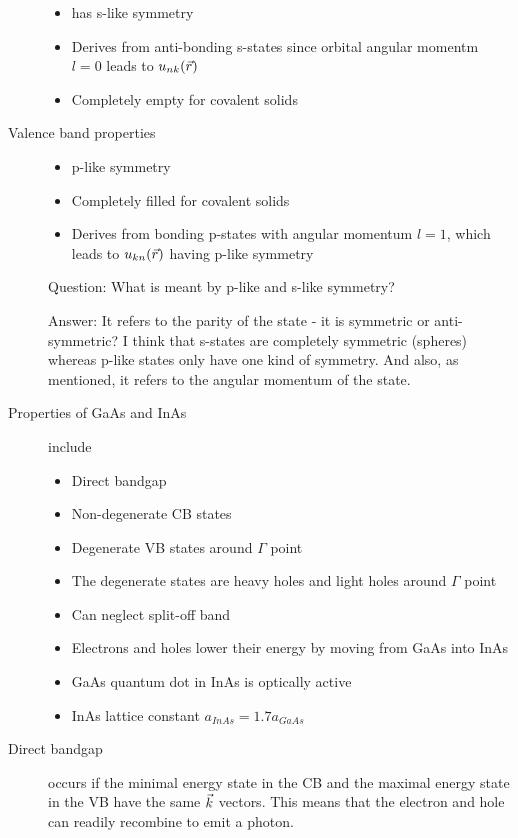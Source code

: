 \begin{description}
\begin{itemize}
\item has s-like symmetry
\item Derives from anti-bonding s-states since orbital angular momentm $l = 0$ leads to $u_{nk}(\vec{r})$ 
\item Completely empty for covalent solids
\end{itemize}

\item[Valence band properties]
\begin{itemize}
\item p-like symmetry
\item Completely filled for covalent solids
\item Derives from bonding p-states with angular momentum $l = 1$, which leads to $u_{kn}(\vec{r})$ having p-like symmetry
\end{itemize}

Question: What is meant by p-like and s-like symmetry?

Answer: It refers to the parity of the state - it is symmetric or anti-symmetric? I think that s-states are completely symmetric (spheres) whereas p-like states only have one kind of symmetry. And also, as mentioned, it refers to the angular momentum of the state. 

\item[Properties of GaAs and InAs] include
\begin{itemize}
\item Direct bandgap
\item Non-degenerate CB states
\item Degenerate VB states around $\Gamma$ point
\item The degenerate states are heavy holes and light holes around $\Gamma$ point
\item Can neglect split-off band
\item Electrons and holes lower their energy by moving from GaAs into InAs
\item GaAs quantum dot in InAs is optically active
\item InAs lattice constant $a_{InAs} = 1.7 a_{GaAs}$
\end{itemize}

\item[Direct bandgap] occurs if the minimal energy state in the CB and the maximal energy state in the VB have the same $\vec{k}$ vectors. This means that the electron and hole can readily recombine to emit a photon. 


\end{description}
